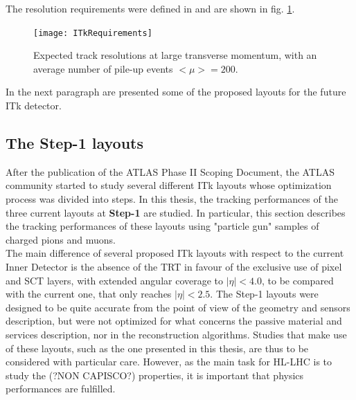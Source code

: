 \documentclass[a4paper,twoside,12pt]{article}
\begin{document}
The resolution requirements were defined in \cite{PerformanceRequirements} and are
shown in fig. \ref{fig:tracking:ITkRequirements}.\\

\begin{figure}
\centering
\texttt{[image: ITkRequirements]}
\caption{Expected track resolutions at large transverse momentum, with an
average number of pile-up events $<\mu>  = 200$.}
\label{fig:tracking:ITkRequirements}
\end{figure}

In the next paragraph are presented some of the proposed layouts for the future ITk detector.

\subsection{The Step-1 layouts}
After the publication of the ATLAS Phase II Scoping Document\cite{scoping}, the ATLAS community 
started to study several different ITk layouts whose optimization process was divided into steps. In this thesis, the
tracking performances of the three current layouts at \textbf{Step-1} are studied. In particular,
this section describes the tracking performances of these layouts using "particle gun" samples of charged
pions and muons.\\

The main difference of several proposed ITk layouts with respect
to the current Inner Detector is the absence of the TRT in favour of the exclusive use of
pixel and SCT layers, with extended angular coverage to $|\eta| < 4.0$, to be compared
with the current one, that only reaches $|\eta| < 2.5$. The Step-1 layouts were designed to 
be quite accurate from the point of view of the geometry and sensors description, but
were not optimized for what concerns the passive material and services description, nor in the
reconstruction algorithms. Studies that make use of these layouts, such as the one presented
in this thesis, are thus to be considered with particular care. However, as the main
task for HL-LHC is to study the (?NON CAPISCO?) properties, it is important that physics performances are fulfilled. \\
\end{document}
